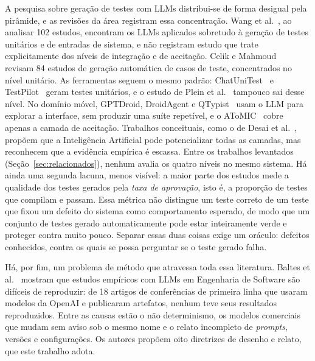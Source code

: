 \documentclass[12pt]{article}
\begin{document}
A pesquisa sobre geração de testes com LLMs distribui-se de forma desigual
pela pirâmide, e as revisões da área registram essa concentração. Wang et
al.~\cite{wang2024survey}, ao analisar 102 estudos, encontram os LLMs
aplicados sobretudo à geração de testes unitários e de entradas de sistema, e
não registram estudo que trate explicitamente dos níveis de integração e de
aceitação. Celik e Mahmoud~\cite{celik2025review} revisam 84 estudos de
geração automática de casos de teste, concentrados no nível unitário. As
ferramentas seguem o mesmo padrão: ChatUniTest~\cite{chen2024chatunitest} e
TestPilot~\cite{schafer2024testpilot} geram testes unitários, e o estudo de
Plein et al.~\cite{plein2023bugreports} tampouco sai desse nível. No domínio
móvel, GPTDroid, DroidAgent e
QTypist~\cite{liu2024gptdroid,yoon2024droidagent,liu2023qtypist} usam o LLM
para explorar a interface, sem produzir uma suíte repetível, e o
AToMIC~\cite{fonseca2025atomic} cobre apenas a camada de aceitação. Trabalhos
conceituais, como o de Desai et al.~\cite{desai2025testpyramid}, propõem que
a Inteligência Artificial pode potencializar todas as camadas, mas
reconhecem que a evidência empírica é escassa. Entre os trabalhos levantados
(Seção~\ref{sec:relacionados}), nenhum avalia os quatro níveis no mesmo
sistema. Há ainda uma segunda
lacuna, menos visível: a maior parte dos estudos mede a qualidade dos testes
gerados pela \emph{taxa de aprovação}, isto é, a proporção de testes que
compilam e passam. Essa métrica não distingue um teste correto de um teste
que fixou um defeito do sistema como comportamento esperado, de modo que um
conjunto de testes gerado automaticamente pode estar inteiramente verde e
proteger contra muito pouco. Separar essas duas coisas exige um oráculo:
defeitos conhecidos, contra os quais se possa perguntar se o teste gerado
falha.

Há, por fim, um problema de método que atravessa toda essa literatura. Baltes
et al.~\cite{baltes2026guidelines} mostram que estudos empíricos com LLMs em
Engenharia de Software são difíceis de reproduzir: de 18 artigos de
conferências de primeira linha que usaram modelos da OpenAI e publicaram
artefatos, nenhum teve seus resultados reproduzidos. Entre as causas estão o
não determinismo, os modelos comerciais que mudam sem aviso sob o mesmo nome
e o relato incompleto de \textit{prompts}, versões e configurações. Os
autores propõem oito diretrizes de desenho e relato, que este trabalho adota.
\end{document}
